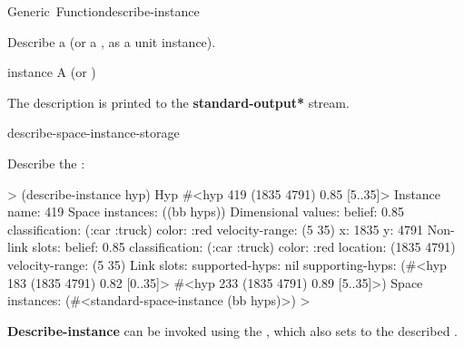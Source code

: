 \documentclass[10pt,twoside,english,pdftex]{article}
\begin{document}
\begin{functiondoc}{Generic~Function}{describe-instance}%
  {}
%
%
%

\fnsyntax

\fnpurpose Describe a  (or a
, as a unit instance).

\fnmethods
{}%
  {\code{(} }
\fnpackage {}

\fnmodule {}

\fnargs
\begin{args}{instance}
\arg[instance] A  (or )
\end{args}

\fndescription
{}%
The description is printed to the {\bf *standard-output*} stream.

\begin{alsos}{describe-space-instance-storage}
\end{alsos}

\fnexample
Describe the  :
%
\W\supp
\begin{example}
  > (describe-instance hyp)
  Hyp #<hyp 419 (1835 4791) 0.85 [5..35]>
    Instance name: 419
    Space instances: ((bb hyps))
    Dimensional values:
      belief:  0.85
      classification:  (:car :truck)
      color:  :red
      velocity-range:  (5 35)
      x:  1835
      y:  4791
    Non-link slots:
      belief:  0.85
      classification:  (:car :truck)
      color:  :red
      location:  (1835 4791)
      velocity-range:  (5 35)
    Link slots:
      supported-hyps:  nil
      supporting-hyps:  (#<hyp 183 (1835 4791) 0.82 [0..35]>
                         #<hyp 233 (1835 4791) 0.89 [5..35]>)
    Space instances: (#<standard-space-instance (bb hyps)>)
  >
\end{example}

\fnnote 
%
%
%
\textbf{Describe-instance} can be invoked using the 
, which also sets \code{=} to the described .

\end{functiondoc}
\end{document}
